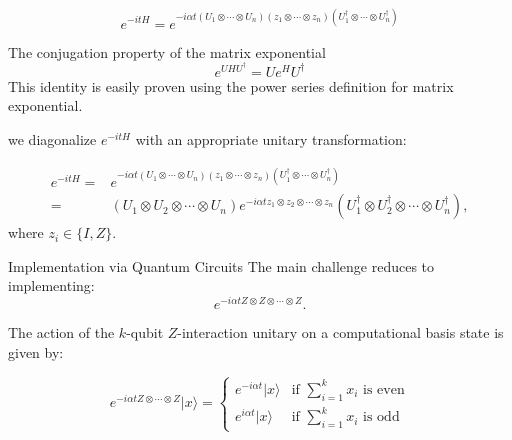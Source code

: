 \documentclass[aspectratio=169,xcolor=dvipsnames]{beamer}
\begin{document}
\begin{frame}

    \begin{equation*}
    e^{-i t H} = e^{-i \alpha t (U_1 \otimes \cdots \otimes U_n)(z_1 \otimes \cdots \otimes z_n)(U_1^\dagger \otimes \cdots \otimes U_n^\dagger)}
  \end{equation*}

  \begin{block}{The conjugation property of the matrix exponential}
    \begin{equation*}
      e^{U H U^{\dagger}} = U e^{H} U^{\dagger}
    \end{equation*}
    This identity is easily proven using the power series definition for matrix exponential. 
  \end{block}

  we diagonalize $e^{-i t H}$ with an appropriate unitary transformation:

  \begin{equation*}
    \begin{align*}
    e^{-i t H} =& e^{-i \alpha t (U_1 \otimes \cdots \otimes U_n)(z_1 \otimes \cdots \otimes z_n)(U_1^\dagger \otimes \cdots \otimes U_n^\dagger)}\\
    =& (U_1 \otimes U_2 \otimes \cdots \otimes U_n) e^{-i \alpha t z_1 \otimes z_2 \otimes \cdots \otimes z_n} (U_1^{\dagger} \otimes U_2^{\dagger} \otimes \cdots \otimes U_n^{\dagger}),
    \end{align*}
  \end{equation*}
  where $z_i \in \{I, Z\}$.
\end{frame}


\begin{frame}{Implementation via Quantum Circuits}
  The main challenge reduces to implementing:
  \begin{equation}
    e^{-i \alpha t Z \otimes Z \otimes \cdots \otimes Z}.
  \end{equation}

  The action of the $k$-qubit $Z$-interaction unitary on a computational basis state is given by:

\[
e^{-i\alpha t Z \otimes \cdots \otimes Z} |x\rangle = 
\begin{cases} 
e^{-i\alpha t} |x\rangle & \text{if } \sum_{i=1}^k x_i \text{ is even} \\
e^{i\alpha t} |x\rangle & \text{if } \sum_{i=1}^k x_i \text{ is odd}
\end{cases}
\]

\end{frame}
\end{document}
